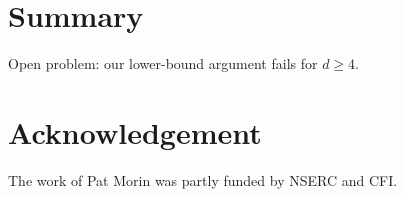 \documentclass{patmorin}
\begin{document}
%
%
%
%
%
%
%

\section{Summary}


Open problem: our lower-bound argument fails for $d\ge 4$.

\section*{Acknowledgement}

The work of Pat Morin was partly funded by NSERC and CFI.



\end{document}
